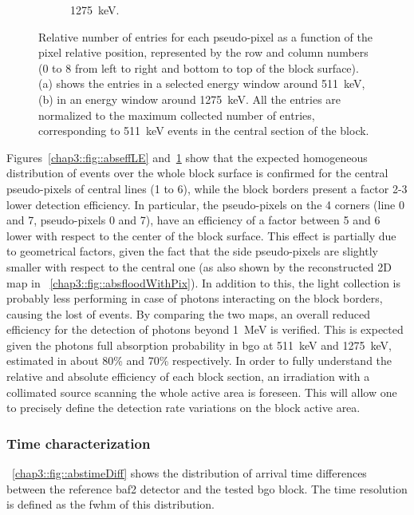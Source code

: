 \begin{figure}
\begin{subfigure}[t]{0.5\textwidth}
\caption{1275~keV.}
\label{chap3::fig::abseffHE}
\end{subfigure}
\caption{Relative number of entries for each pseudo-pixel as a function of the pixel relative position, represented by the row and column numbers (0 to 8 from left to right and bottom to top of the block surface). \figurename (a) shows the entries in a selected energy window around 511~keV, \figurename (b) in an energy window around 1275~keV. All the entries are normalized to the maximum collected number of entries, corresponding to 511~keV events in the central section of the block.}
\label{chap3::fig::absefficiency}
\end{figure}

Figures~\ref{chap3::fig::abseffLE} and~\ref{chap3::fig::abseffHE} show that the expected homogeneous distribution of events over the whole block surface is confirmed for the central pseudo-pixels of central lines (1 to 6), while the block borders present a factor 2-3 lower detection efficiency. In particular, the pseudo-pixels on the 4 corners (line 0 and 7, pseudo-pixels 0 and 7), have an efficiency of a factor between 5 and 6 lower with respect to the center of the block surface. This effect is partially due to geometrical factors, given the fact that the side pseudo-pixels are slightly smaller with respect to the central one (as also shown by the reconstructed 2D map in \figurename~\ref{chap3::fig::absfloodWithPix}). In addition to this, the light collection is probably less performing in case of photons interacting on the block borders, causing the lost of events. By comparing the two maps, an overall reduced efficiency for the detection of photons beyond 1~MeV is verified. This is expected given the photons full absorption probability in \gls{bgo} at 511~keV and 1275~keV, estimated in about 80\% and 70\% respectively. In order to fully understand the relative and absolute efficiency of each block section, an irradiation with a collimated source scanning the whole active area is foreseen. This will allow one to precisely define the detection rate variations on the block active area.

\subsubsection{Time characterization}\label{chap3::subsubsec::timeChar}

\figurename~\ref{chap3::fig::abstimeDiff} shows the distribution of arrival time differences between the reference \gls{baf2} detector and the tested \gls{bgo} block. The time resolution is defined as the \gls{fwhm} of this distribution.

